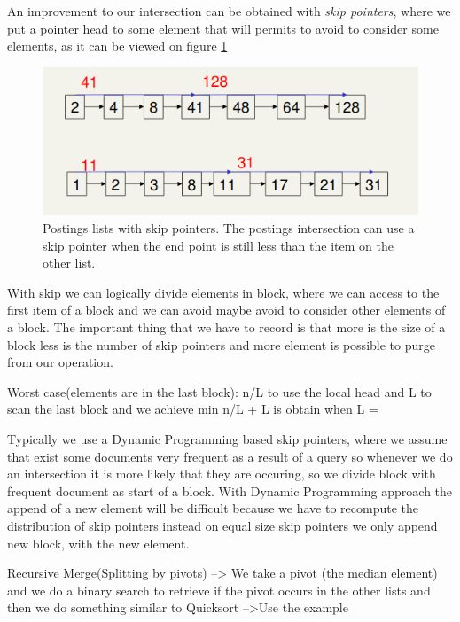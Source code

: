 An improvement to our intersection can be obtained with \emph{skip pointers}, where we put a pointer 
head to some element that will permits to avoid to consider some elements, as it can be viewed on 
figure \ref{img:skip}

\begin{figure}
    \caption{Postings lists with skip pointers. The postings intersection can use a skip pointer
             when the end point is still less than the item on the other list.}
    \label{img:skip}
    \includegraphics[width=\textwidth]{Images/skip}
\end{figure}
With skip we can logically divide elements in block, where we can access to the first item of a block and we 
can avoid maybe avoid to consider other elements of a block.\newline
The important thing that we have to record is that more is the size of a block less is the number of skip pointers 
and more element is possible to purge from our operation.


Worst case(elements are in the last block): 
n/L to use the local head and L to scan the last block and we achieve min n/L + L is obtain when L = 

Typically we use a Dynamic Programming based skip pointers, where we assume that exist some documents 
very frequent as a result of a query so whenever we do an intersection it is more likely that they are occuring,
so we divide block with frequent document as start of a block.\newline
With Dynamic Programming approach the append of a new element will be difficult because we have to recompute
the distribution of skip pointers instead on equal size skip pointers we only append 
new block, with the new element.

Recursive Merge(Splitting by pivots) --> We take a pivot (the median element) and we do a binary search to 
retrieve if the pivot occurs in the other lists and then we do something similar to Quicksort -->Use the example 

